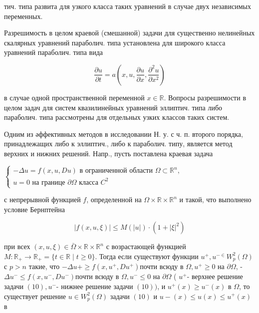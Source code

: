 \documentclass[10pt]{article}
\begin{document}
тич. типа развита для узкого класса таких уравнений в случае двух независимых переменных.



Разрешимость в целом краевой (смешанной) задачи для существенно нелинейных скалярных уравнений параболич. типа установлена для широкого класса уравнений параболич. типа вида



\[

\frac{\partial u}{\partial t}=a\left(x, u, \frac{\partial u}{\partial x}, \frac{\partial^{2} u}{\partial x^{2}}\right)

\]



в случае одной пространственной переменной $x \in \mathbb{R}$. Вопросы разрешимости в целом задач для систем квазилинейных уравнений эллиптич. типа либо параболич. типа рассмотрены для отдельных узких классов таких систем.



Одним из әффективных методов в исследовании Н. у. с ч. п. второго порядка, принадлежащих либо к эллиптич., либо к параболич. типу, является метод верхних и нижних решений. Напр., пусть поставлена краевая задача



$\left\{\begin{array}{l}-\Delta u=f(x, u, D u) \text { в ограниченной области } \Omega \subset \mathbb{R}^{n}, \\ u=0 \text { на границе } \partial \Omega \text { класса } C^{2}\end{array}\right.$



с непрерывной функцией $f$, определенной на $\Omega \times \mathbb{R} \times \mathbb{R}^{n}$ и такой, что выполнено условие Бернптейна



\[

|f(x, u, \xi)| \leqslant M(|u|) \cdot\left(1+|\xi|^{2}\right)

\]



при всех $(x, u, \xi) \in \bar{\Omega} \times \mathbb{R} \times \mathbb{R}^{n}$ с возрастающей функцией $M: \mathbb{R}_{+} \rightarrow \mathbb{R}_{+}=\{t \in \mathbb{R} \mid t \geqslant 0\}$. Тогда если существуют функции $u^{+}, u^{-\in} W_{p}^{2}(\Omega)$ с $p>n$ такие, что $-\Delta u+\geqslant f\left(x, u^{+}, D u^{+}\right)$почти всюду в $\Omega, u^{+} \geqslant 0$ на $\partial \Omega$, - $\Delta u^{-} \leqslant f\left(x, u^{-}, D u^{-}\right)$почти всюду в $\Omega, u^{-} \leqslant 0$ на $\partial \Omega$ ( $u^{+}$- верхнее решение задачи $(10), u^{-}$- нижнее решение задачи $(10))$, и $u^{+}(x) \geqslant u^{-}(x)$ в $\Omega$, то существует решение $u \in W_{p}^{2}(\Omega)$ задачи $(10)$ и $u-(x) \leqslant u(x) \leqslant u^{+}(x)$ в
\end{document}
